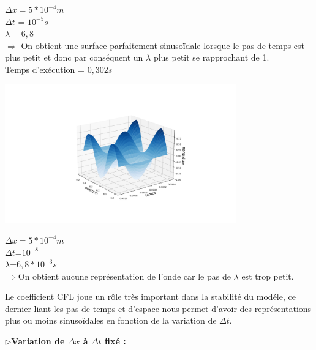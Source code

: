 \begin{enumerate}[label=\alph*)]
\begin{minipage}{.5\textwidth}%
\item $\Delta x = 5*{10}^{-4}m$\\
$\Delta t$ = ${10}^{-5} s $ \\
$\lambda =6,8$\\

$\Longrightarrow$ On obtient une surface parfaitement  sinusoïdale lorsque le pas de temps est plus petit et donc par conséquent un $\lambda$ plus petit se rapprochant de 1.\\ 
Temps d'exécution = $0,302s$
\end{minipage}%
\hfill
\begin{minipage}{.45\textwidth}%
\includegraphics[width=10cm,height=6cm]{implicited.png}
\end{minipage}%




\begin{minipage}{.8\textwidth}%

\item $\Delta x=5*{10}^{-4}m$\\
$\Delta t$=${10}^{-8}$\\
$\lambda$=$6,8*{10}^{-3}s$\\


$\Longrightarrow$On obtient aucune représentation de l'onde car le pas de $\lambda$ est trop petit.\\

\end{minipage}%
\newline
\newline
Le coefficient CFL joue un rôle très important dans la stabilité du modéle, ce dernier liant les pas de temps et d'espace nous permet d'avoir des représentations plus ou moins sinusoïdales en fonction de la variation de $\Delta t$.
\end{enumerate}

$\triangleright$\textbf{Variation de  $\Delta x$ à $\Delta t$ fixé :}\\


